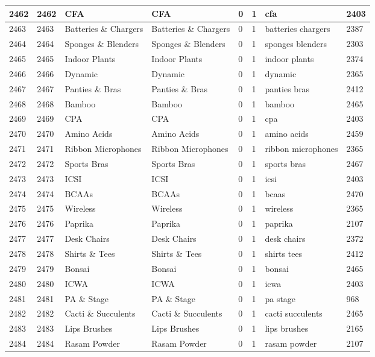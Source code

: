\begin{longtable}{|l|l|l|l|l|l|l|l|}
2462 & 2462 & CFA & CFA & 0 & 1 & cfa & 2403 \\ \hline 
2463 & 2463 & Batteries \& Chargers & Batteries \& Chargers & 0 & 1 & batteries chargers & 2387 \\ \hline 
2464 & 2464 & Sponges \& Blenders & Sponges \& Blenders & 0 & 1 & sponges blenders & 2303 \\ \hline 
2465 & 2465 & Indoor Plants & Indoor Plants & 0 & 1 & indoor plants & 2374 \\ \hline 
2466 & 2466 & Dynamic & Dynamic & 0 & 1 & dynamic & 2365 \\ \hline 
2467 & 2467 & Panties \& Bras & Panties \& Bras & 0 & 1 & panties bras & 2412 \\ \hline 
2468 & 2468 & Bamboo & Bamboo & 0 & 1 & bamboo & 2465 \\ \hline 
2469 & 2469 & CPA & CPA & 0 & 1 & cpa & 2403 \\ \hline 
2470 & 2470 & Amino Acids & Amino Acids & 0 & 1 & amino acids & 2459 \\ \hline 
2471 & 2471 & Ribbon Microphones & Ribbon Microphones & 0 & 1 & ribbon microphones & 2365 \\ \hline 
2472 & 2472 & Sports Bras & Sports Bras & 0 & 1 & sports bras & 2467 \\ \hline 
2473 & 2473 & ICSI & ICSI & 0 & 1 & icsi & 2403 \\ \hline 
2474 & 2474 & BCAAs & BCAAs & 0 & 1 & bcaas & 2470 \\ \hline 
2475 & 2475 & Wireless & Wireless & 0 & 1 & wireless & 2365 \\ \hline 
2476 & 2476 & Paprika & Paprika & 0 & 1 & paprika & 2107 \\ \hline 
2477 & 2477 & Desk Chairs & Desk Chairs & 0 & 1 & desk chairs & 2372 \\ \hline 
2478 & 2478 & Shirts \& Tees & Shirts \& Tees & 0 & 1 & shirts tees & 2412 \\ \hline 
2479 & 2479 & Bonsai & Bonsai & 0 & 1 & bonsai & 2465 \\ \hline 
2480 & 2480 & ICWA & ICWA & 0 & 1 & icwa & 2403 \\ \hline 
2481 & 2481 & PA \& Stage & PA \& Stage & 0 & 1 & pa stage & 968 \\ \hline 
2482 & 2482 & Cacti \& Succulents & Cacti \& Succulents & 0 & 1 & cacti succulents & 2465 \\ \hline 
2483 & 2483 & Lips Brushes & Lips Brushes & 0 & 1 & lips brushes & 2165 \\ \hline 
2484 & 2484 & Rasam Powder & Rasam Powder & 0 & 1 & rasam powder & 2107 \\ \hline 

\end{longtable}
